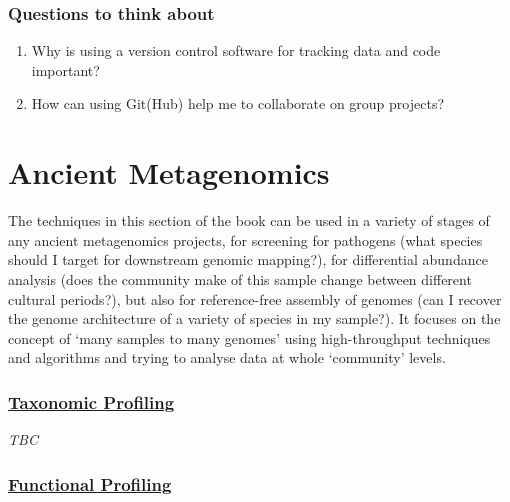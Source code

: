 \documentclass[
  letterpaper,
]{book}
\providecommand{\tightlist}{%
  \setlength{\itemsep}{0pt}\setlength{\parskip}{0pt}}\usepackage{longtable,booktabs,array}
\begin{document}
\hypertarget{questions-to-think-about-4}{%
\section{Questions to think about}\label{questions-to-think-about-4}}

\begin{enumerate}
\def\labelenumi{\arabic{enumi}.}
\tightlist
\item
  Why is using a version control software for tracking data and code
  important?
\item
  How can using Git(Hub) help me to collaborate on group projects?
\end{enumerate}

\part{Ancient Metagenomics}

The techniques in this section of the book can be used in a variety of
stages of any ancient metagenomics projects, for screening for pathogens
(what species should I target for downstream genomic mapping?), for
differential abundance analysis (does the community make of this sample
change between different cultural periods?), but also for reference-free
assembly of genomes (can I recover the genome architecture of a variety
of species in my sample?). It focuses on the concept of `many samples to
many genomes' using high-throughput techniques and algorithms and trying
to analyse data at whole `community' levels.

\hypertarget{taxonomic-profiling}{%
\section*{\texorpdfstring{\protect\hyperlink{taxonomic-profiling-otu-tables-and-visualisation}{Taxonomic
Profiling}}{Taxonomic Profiling}}\label{taxonomic-profiling}}


\emph{TBC}

\hypertarget{functional-profiling}{%
\section*{\texorpdfstring{\protect\hyperlink{functional-profiling-1}{Functional
Profiling}}{Functional Profiling}}\label{functional-profiling}}
\end{document}
